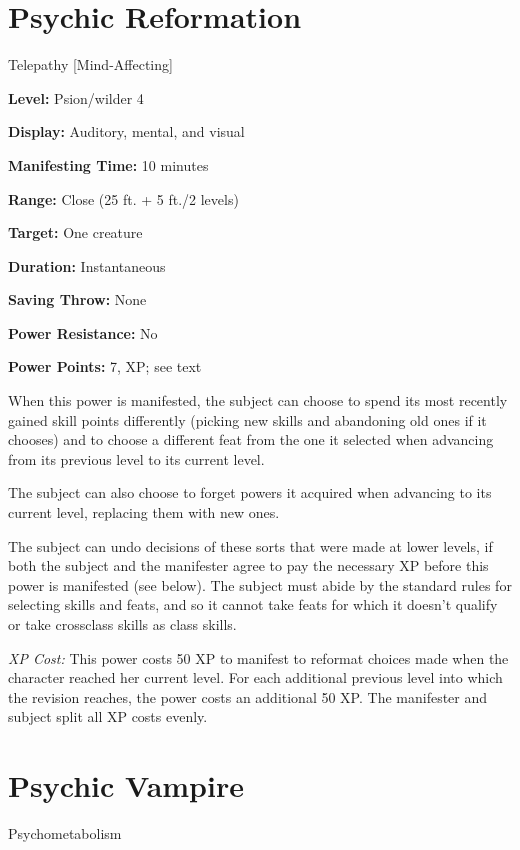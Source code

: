 \documentclass{article}
\begin{document}
\vspace{12pt}
\section*{Psychic Reformation}

Telepathy [Mind-Affecting]

\textbf{Level:} Psion/wilder 4

\textbf{Display:} Auditory, mental, and visual

\textbf{Manifesting Time:} 10 minutes

\textbf{Range:} Close (25 ft. + 5 ft./2 levels)

\textbf{Target:} One creature

\textbf{Duration:} Instantaneous

\textbf{Saving Throw:} None

\textbf{Power Resistance:} No

\textbf{Power Points:} 7, XP; see text

When this power is manifested, the subject can choose to spend its most recently 
gained skill points differently (picking new skills and abandoning old ones if 
it chooses) and to choose a different feat from the one it selected when advancing 
from its previous level to its current level.

The subject can also choose to forget powers it acquired when advancing to its 
current level, replacing them with new ones.

The subject can undo decisions of these sorts that were made at lower levels, if 
both the subject and the manifester agree to pay the necessary XP before this power 
is manifested (see below). The subject must abide by the standard rules for selecting 
skills and feats, and so it cannot take feats for which it doesn't qualify or take 
crossclass skills as class skills.

\textit{XP Cost: }This power costs 50 XP to manifest to reformat choices made when 
the character reached her current level. For each additional previous level into 
which the revision reaches, the power costs an additional 50 XP. The manifester 
and subject split all XP costs evenly.

\vspace{12pt}
\section*{Psychic Vampire}

Psychometabolism
\end{document}
